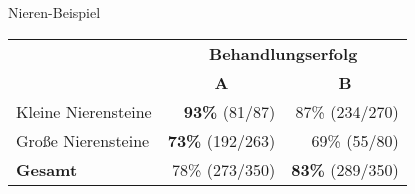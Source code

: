 \begin{frame}{Nieren-Beispiel}
    \begin{table}
        \begin{tabular}{lrr}
        \toprule
        ~      & \multicolumn{2}{c}{\textbf{Behandlungserfolg}}  \\
        \cmidrule{2-3}
        ~                   & \multicolumn{1}{c}{\textbf{A}} & \multicolumn{1}{c}{\textbf{B}} \\ \midrule
        Kleine Nierensteine & \textbf{93\%}  (\hphantom{0}81/\hphantom{0}87)  & 87\% (234/270) \\
        Große Nierensteine  & \textbf{73\%} (192/263) & 69\% (\hphantom{0}55/\hphantom{0}80)\\
        \textbf{Gesamt}     & 78\% (273/350)          & \textbf{83\%} (289/350) \\
        \bottomrule
        \end{tabular}
    \end{table}

    \begin{figure}[!h]
        \centering
    \end{figure}

\end{frame}